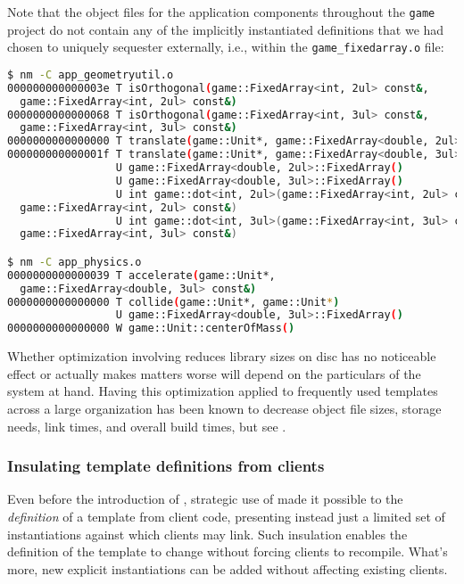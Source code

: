 \noindent Note that the object files for the application components throughout the
\lstinline!game! project do not contain any of the implicitly
instantiated definitions that we had chosen to uniquely sequester
externally, i.e., within the \lstinline!game_fixedarray.o! file:

\begin{lstlisting}[language=bash]
$ nm -C app_geometryutil.o
000000000000003e T isOrthogonal(game::FixedArray<int, 2ul> const&,
  game::FixedArray<int, 2ul> const&)
0000000000000068 T isOrthogonal(game::FixedArray<int, 3ul> const&,
  game::FixedArray<int, 3ul> const&)
0000000000000000 T translate(game::Unit*, game::FixedArray<double, 2ul> const&)
000000000000001f T translate(game::Unit*, game::FixedArray<double, 3ul> const&)
                 U game::FixedArray<double, 2ul>::FixedArray()
                 U game::FixedArray<double, 3ul>::FixedArray()
                 U int game::dot<int, 2ul>(game::FixedArray<int, 2ul> const&,
  game::FixedArray<int, 2ul> const&)
                 U int game::dot<int, 3ul>(game::FixedArray<int, 3ul> const&,
  game::FixedArray<int, 3ul> const&)

$ nm -C app_physics.o
0000000000000039 T accelerate(game::Unit*,
  game::FixedArray<double, 3ul> const&)
0000000000000000 T collide(game::Unit*, game::Unit*)
                 U game::FixedArray<double, 3ul>::FixedArray()
0000000000000000 W game::Unit::centerOfMass()
\end{lstlisting}

\noindent Whether optimization involving  reduces library sizes on disc has no noticeable effect or
actually makes matters worse will depend on the particulars of the
system at hand. Having this optimization applied to frequently used
templates across a large organization has been known to decrease object
file sizes, storage needs, link times, and overall build times, but see .

\subsubsection[Insulating template definitions from clients]{Insulating template definitions from clients}\label{insulating-template-definitions-from-clients}

Even before the introduction of , strategic use of  made it possible to  the
\emph{definition} of a template from client code, presenting instead
just a limited set of instantiations against which clients may link.
Such insulation enables the definition of the template to change without
forcing clients to recompile. What's more, new explicit instantiations
can be added without affecting existing clients.

